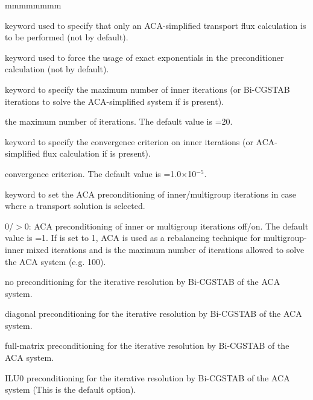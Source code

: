 \begin{ListeDeDescription}{mmmmmmmm}
\item[\moc{DIFC}] keyword used to specify that only an ACA-simplified transport flux calculation is to be performed (not by default).

\item[\moc{LEXA}] keyword used to force the usage of exact exponentials in the preconditioner calculation (not by default).

\item[\moc{MAXI}] keyword to specify the maximum number of inner iterations (or Bi-CGSTAB iterations to solve the ACA-simplified system if   is present).

\item[\dusa{nmaxi}] the maximum number of iterations. The default value
is =20.

\item[\moc{EPSI}] keyword to specify the convergence criterion on inner
iterations (or ACA-simplified flux calculation if  is present).

\item[\dusa{xepsi}] convergence criterion. The default value is =1.0$\times$10$^{-5}$.

\item[\moc{AAC}] keyword to set the ACA preconditioning of inner/multigroup
iterations in case where a transport solution is selected.\cite{cdd,suslov2}

\item[\dusa{iaca}] $0$/$>0$: ACA preconditioning of inner or multigroup iterations off/on. The default value is =1. If  is set to 1, ACA is used as a rebalancing technique for multigroup-inner mixed iterations and  is the maximum number of iterations allowed to solve the ACA system (e.g. 100).

\item[\moc{NONE}] no preconditioning for the iterative resolution by Bi-CGSTAB of the ACA system.

\item[\moc{DIAG}] diagonal preconditioning for the iterative resolution by Bi-CGSTAB of the ACA system.

\item[\moc{FULL}] full-matrix preconditioning for the iterative resolution by Bi-CGSTAB of the ACA system.

\item[\moc{ILU0}] ILU0 preconditioning for the iterative resolution by Bi-CGSTAB of the ACA system (This is the default option).


\end{ListeDeDescription}
